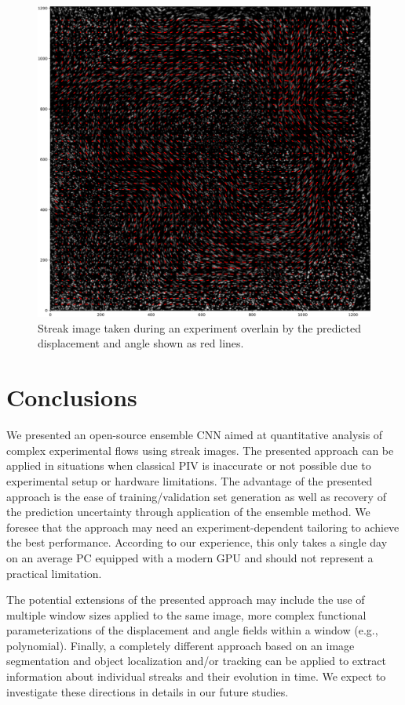\documentclass{svjour3}                     %
\begin{document}
\begin{figure}
\includegraphics[width=\textwidth]{figs/figure9.png}
\caption{Streak image taken during an experiment overlain by the predicted displacement and angle shown as red lines.}
\label{fig:fig10}
\end{figure}

\section{Conclusions}

We presented an open-source ensemble CNN aimed at quantitative analysis of complex experimental flows using streak images. The presented approach can be applied in situations when classical PIV is inaccurate or not possible due to experimental setup or hardware limitations. The advantage of the presented approach is the ease of training/validation set generation as well as recovery of the prediction uncertainty through application of the ensemble method. We foresee that the approach may need an experiment-dependent tailoring to achieve the best performance. According to our experience, this only takes a single day on an average PC equipped with a modern GPU and should not represent a practical limitation.

The potential extensions of the presented approach may include the use of multiple window sizes applied to the same image, more complex functional parameterizations of the displacement and angle fields within a window (e.g., polynomial). Finally, a completely different approach based on an image segmentation and object localization and/or tracking can be applied to extract information about individual streaks and their evolution in time. We expect to investigate these directions in details in our future studies.
\end{document}
